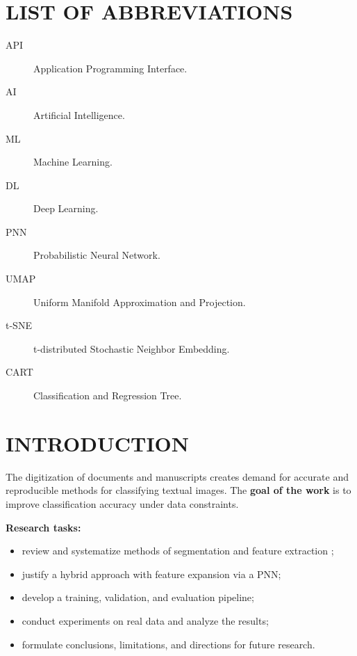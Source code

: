 \documentclass{article}
\begin{document}
\clearpage
\tableofcontents
\clearpage

\section*{LIST OF ABBREVIATIONS}
\begin{description}
  \item[API] Application Programming Interface.
  \item[AI] Artificial Intelligence.
  \item[ML] Machine Learning.
  \item[DL] Deep Learning.
  \item[PNN] Probabilistic Neural Network.
  \item[UMAP] Uniform Manifold Approximation and Projection.
  \item[t-SNE] t-distributed Stochastic Neighbor Embedding.
  \item[CART] Classification and Regression Tree.
\end{description}
\clearpage

\section*{INTRODUCTION}
The digitization of documents and manuscripts creates demand for accurate and reproducible methods
for classifying textual images. The \textbf{goal of the work} is to improve classification accuracy under
data constraints.

\textbf{Research tasks:}
\begin{itemize}
  \item review and systematize methods of segmentation and feature extraction \cite{otsu1979,canny1986};
  \item justify a hybrid approach with feature expansion via a PNN;
  \item develop a training, validation, and evaluation pipeline;
  \item conduct experiments on real data and analyze the results;
  \item formulate conclusions, limitations, and directions for future research.
\end{itemize}
\end{document}
